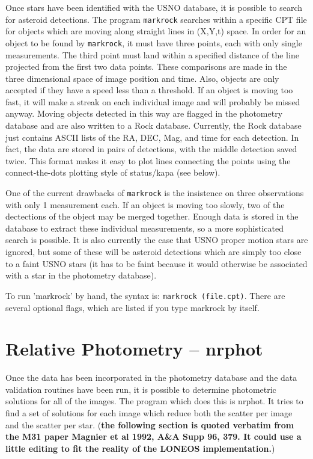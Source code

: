 \documentclass{article}
\newcommand{\note}[1]{({\bf #1})}
\begin{document}
Once stars have been identified with the USNO database, it is possible
to search for asteroid detections.  The program {\tt markrock}
searches within a specific CPT file for objects which are moving along
straight lines in (X,Y,t) space.  In order for an object to be found
by {\tt markrock}, it must have three points, each with only single
measurements.  The third point must land within a specified distance
of the line projected from the first two data points.  These
comparisons are made in the three dimensional space of image position
and time.  Also, objects are only accepted if they have a speed less
than a threshold.  If an object is moving too fast, it will make a
streak on each individual image and will probably be missed anyway.
Moving objects detected in this way are flagged in the photometry
database and are also written to a Rock database.  Currently, the Rock
database just contains ASCII lists of the RA, DEC, Mag, and time for
each detection.  In fact, the data are stored in pairs of detections,
with the middle detection saved twice.  This format makes it easy to
plot lines connecting the points using the connect-the-dots plotting
style of status/kapa (see below).

One of the current drawbacks of {\tt markrock} is the insistence on
three observations with only 1 measurement each.  If an object is
moving too slowly, two of the dectections of the object may be merged
together.  Enough data is stored in the database to extract these
individual measurements, so a more sophisticated search is possible.
It is also currently the case that USNO proper motion stars are
ignored, but some of these will be asteroid detections which are
simply too close to a faint USNO stars (it has to be faint because it
would otherwise be associated with a star in the photometry
database).  

To run 'markrock' by hand, the syntax is: {\tt markrock (file.cpt)}.
There are several optional flags, which are listed if you type
markrock by itself.

\section{Relative Photometry -- nrphot}

Once the data has been incorporated in the photometry database and the
data validation routines have been run, it is possible to determine
photometric solutions for all of the images.  The program which does
this is nrphot.  It tries to find a set of solutions for each image
which reduce both the scatter per image and the scatter per star.
\note{the following section is quoted verbatim from the M31 paper
  Magnier et al 1992, A\&A Supp 96, 379.  It could use a little
  editing to fit the reality of the LONEOS implementation.}
\end{document}
